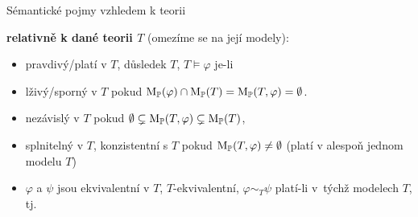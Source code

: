 \documentclass{beamer}
\begin{document}
\begin{frame}{Sémantické pojmy vzhledem k teorii}

    \textbf{relativně k dané teorii $T$} (omezíme se na její modely):
    \begin{itemize}
        \item \alert{pravdivý/platí v $T$}, \alert{důsledek $T$}, \alert{$T \models \varphi$} je-li 
        \item \alert{lživý/sporný v $T$} pokud $\operatorname{M}_\mathbb P(\varphi)\cap\operatorname{M}_\mathbb P(T)=\operatorname{M}_\mathbb P(T,\varphi)=\emptyset$.
        \item \alert{nezávislý v $T$} pokud $\emptyset\subsetneq\operatorname{M}_\mathbb P(T,\varphi)\subsetneq\operatorname{M}_\mathbb P(T)$,
        \item \alert{splnitelný v $T$}, \alert{konzistentní s $T$} pokud $\operatorname{M}_\mathbb P(T,\varphi)\neq\emptyset$ (platí v alespoň jednom modelu $T$)
        \item $\varphi$ a $\psi$ jsou \alert{ekvivalentní v $T$}, \alert{$T$-ekvivalentní}, \alert{$\varphi\sim_T\psi$} platí-li v~týchž modelech $T$, tj. 
    \end{itemize}


\end{frame}
\end{document}
